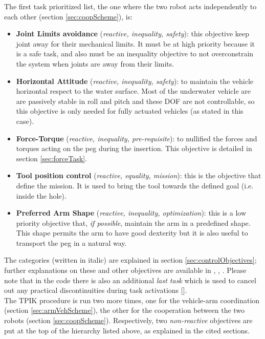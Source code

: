 The first task prioritized list, the one where the two robot acts independently to each other (section \ref{sec:coopScheme}), is:
\begin{itemize}
	\item \textbf{Joint Limits avoidance} (\textit{reactive, inequality, safety}): this objective keep joint away for their mechanical limits. It must be at high priority because it is a safe task, and also must be an inequality objective to not overconstrain the system when joints are away from their limits.
	
	\item \textbf{Horizontal Attitude} (\textit{reactive, inequality, safety}): to maintain the vehicle horizontal respect to the water surface. Most of the underwater vehicle are are passively stable in roll and pitch and these DOF are not controllable, so this objective is only needed for fully actuated vehicles (as stated in this case).
	
	\item \textbf{Force-Torque} (\textit{reactive, inequality, pre-requisite}): to nullified the forces and torques acting on the peg during the insertion. This objective is detailed in section \ref{sec:forceTask}.
	
	\item \textbf{Tool position control} (\textit{reactive, equality, mission}): this is the objective that define the mission. It is used to bring the tool towards the defined goal (i.e. inside the hole).
	
	\item \textbf{Preferred Arm Shape} (\textit{reactive, inequality, optimization}): this is a low priority objective that, \textit{if possible}, maintain the arm in a predefined shape. This shape permits the arm to have good dexterity but it is also useful to transport the peg in a natural way.
		
\end{itemize}

\noindent The categories (written in italic) are explained in section \ref{sec:controlObjectives}; further explanations on these and other objectives are available in \cite{IntroMaris2}, \cite{tesiWander}, \cite{IntroRecent}. Please note that in the code there is also an additional \textit{last task} which is used to cancel out any practical discontinuities during task activations [\cite{IntroMaris1}].\\

The TPIK procedure is run two more times, one for the vehicle-arm coordination (section \ref{sec:armVehScheme}), the other for the cooperation between the two robots (section \ref{sec:coopScheme}). Respectively, two \textit{non-reactive} objectives are put at the top of the hierarchy listed above, as explained in the cited sections.\\

